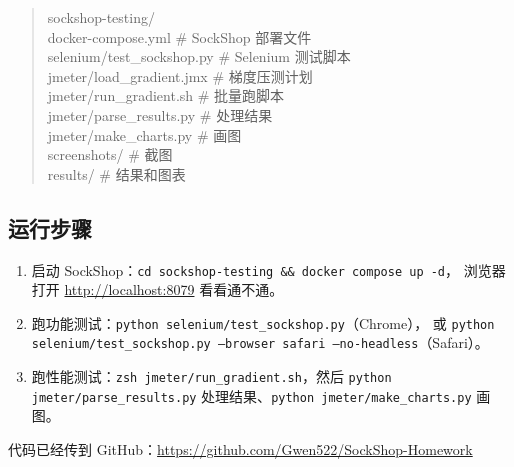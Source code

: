 \documentclass[11pt,a4paper]{ctexart}
\begin{document}
\begin{quote}\small\ttfamily
sockshop-testing/\\
\hspace*{1em}docker-compose.yml \quad\# SockShop 部署文件\\
\hspace*{1em}selenium/test\_sockshop.py \quad\# Selenium 测试脚本\\
\hspace*{1em}jmeter/load\_gradient.jmx \quad\# 梯度压测计划\\
\hspace*{1em}jmeter/run\_gradient.sh \quad\# 批量跑脚本\\
\hspace*{1em}jmeter/parse\_results.py \quad\# 处理结果\\
\hspace*{1em}jmeter/make\_charts.py \quad\# 画图\\
\hspace*{1em}screenshots/ \quad\# 截图\\
\hspace*{1em}results/ \quad\# 结果和图表
\end{quote}

\subsection{运行步骤}

\begin{enumerate}[leftmargin=2em]
  \item 启动 SockShop：\texttt{cd sockshop-testing \&\& docker compose up -d}，
  浏览器打开 \url{http://localhost:8079} 看看通不通。
  \item 跑功能测试：\texttt{python selenium/test\_sockshop.py}（Chrome），
  或 \texttt{python selenium/test\_sockshop.py --browser safari --no-headless}（Safari）。
  \item 跑性能测试：\texttt{zsh jmeter/run\_gradient.sh}，然后 \texttt{python jmeter/parse\_results.py}
  处理结果、\texttt{python jmeter/make\_charts.py} 画图。
\end{enumerate}

\noindent 代码已经传到 GitHub：\url{https://github.com/Gwen522/SockShop-Homework}
\end{document}
